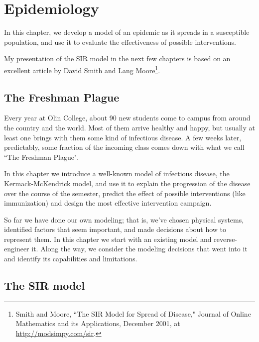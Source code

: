 \documentclass[12pt]{book}
\theoremstyle{exercise}
\begin{document}
\chapter{Epidemiology}
\label{chap11}

In this chapter, we develop a model of an epidemic as it spreads in a susceptible population, and use it to evaluate the effectiveness of possible interventions.


My presentation of the SIR model in the next few chapters is based on an excellent article by David Smith and Lang Moore\footnote{Smith and Moore, ``The SIR Model for Spread of Disease," Journal of Online Mathematics and its Applications, December 2001, at \url{http://modsimpy.com/sir}.}.



\section{The Freshman Plague}

Every year at Olin College, about 90 new students come to campus from around the country and the world.  Most of them arrive healthy and happy, but usually at least one brings with them some kind of infectious disease.  A few weeks later, predictably, some fraction of the incoming class comes down with what we call ``The Freshman Plague".


In this chapter we introduce a well-known model of infectious disease, the Kermack-McKendrick model, and use it to explain the progression of the disease over the course of the semester, predict the effect of possible interventions (like immunization) and design the most effective intervention campaign.


So far we have done our own modeling; that is, we've chosen physical systems, identified factors that seem important, and made decisions about how to represent them.  In this chapter we start with an existing model and reverse-engineer it.  Along the way, we consider the modeling decisions that went into it and identify its capabilities and limitations.


\section{The SIR model}
\label{sirmodel}
\end{document}
